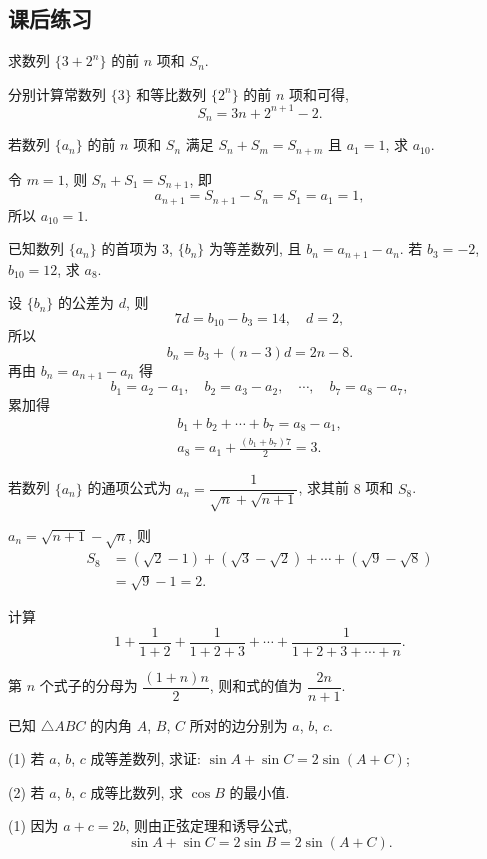\subsection{课后练习}
\begin{exercise}
    求数列 $\{3+2^n\}$ 的前 $n$ 项和 $S_n$.
\end{exercise}
\beginsolution
    分别计算常数列 $\{3\}$ 和等比数列 $\{2^n\}$ 的前 $n$ 项和可得, 
    \[S_n= 3n+ 2^{n+1}-2.\]
\endsolution

\begin{exercise}
    若数列 $\{a_n\}$ 的前 $n$ 项和 $S_n$ 满足 $S_n+S_m =S_{n+m}$ 且 $a_1=1$, 求 $a_{10}$.
\end{exercise}
\beginsolution
    令 $m=1$, 则 $S_n+S_1= S_{n+1}$, 即
    \[a_{n+1}= S_{n+1}- S_n= S_1= a_1= 1,\]
    所以 $a_{10}=1$.
\endsolution

\begin{exercise}
    已知数列 $\{a_n\}$ 的首项为 $3$, $\{b_n\}$ 为等差数列, 且 $b_n =a_{n+1}-a_n$. 若 $b_3=-2$, $b_{10}=12$, 求 $a_8$.
\end{exercise}
\beginsolution
    设 $\{b_n\}$ 的公差为 $d$, 则
    \[7d= b_{10}-b_3= 14,\quad d=2,\]
    所以
    \[b_n= b_3+(n-3)d= 2n-8.\]
    再由 $b_n= a_{n+1}- a_n$ 得
    \[b_1= a_2-a_1,\quad b_2= a_3-a_2,\quad\cdots,\quad
     b_7= a_8-a_7,\]
     累加得
     \[\begin{gathered}
        b_1+b_2+\cdots +b_7= a_8-a_1,\\
        a_8= a_1+ \frac{(b_1+b_7)7}2= 3.
     \end{gathered}\]
\endsolution

\begin{exercise}
    若数列 $\{a_n\}$ 的通项公式为 $a_n=\dfrac1{\sqrt{n}+ \sqrt{n+1}}$, 求其前 $8$ 项和 $S_8$.
\end{exercise}
\beginsolution
    $a_n=\sqrt{n+1}- \sqrt{n}$, 则
    \[\begin{aligned}
        S_8
        &= (\sqrt2-1)+ (\sqrt3-\sqrt2)+\cdots +(\sqrt9-\sqrt8)\\
        &= \sqrt9-1= 2.
    \end{aligned}\]
\endsolution

\begin{exercise}
    计算 
    \[1+\dfrac1{1+2}+\dfrac1{1+2+3}+\cdots +\dfrac1{1+2+3+\cdots +n}.\]
\end{exercise}
\beginsolution
    第 $n$ 个式子的分母为 $\dfrac{(1+n)n}2$, 则和式的值为 $\dfrac{2n}{n+1}$.
\endsolution

\begin{exercise}
    已知 $\triangle ABC$ 的内角 $A$, $B$, $C$ 所对的边分别为 $a$, $b$, $c$.
    
    (1) 若 $a$, $b$, $c$ 成等差数列, 求证: $\sin A+\sin C= 2\sin(A+C)$;
    
    (2) 若 $a$, $b$, $c$ 成等比数列, 求 $\cos B$ 的最小值.
\end{exercise}
\beginsolution
    (1) 因为 $a+c= 2b$, 则由正弦定理和诱导公式,
    \[\sin A+\sin C= 2\sin B= 2\sin(A+C).\]

